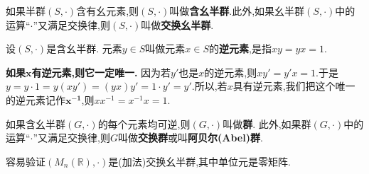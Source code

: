 \documentclass[lang=cn,newtx,10pt,scheme=chinese]{elegantbook}
\begin{document}
\begin{definition}[(交换)含幺半群定义]\label{definition:(交换)幺半群定义}
如果半群\((S,\cdot)\)含有幺元素,则\((S,\cdot)\)叫做\textbf{含幺半群}.此外,如果幺半群\((S,\cdot)\)中的运算“$\cdot$”又满足交换律,则\((S,\cdot)\)叫做\textbf{交换幺半群}.
\end{definition}

\begin{definition}
设\((S,\cdot)\)是含幺半群. 元素\(y\in S\)叫做元素\(x\in S\)的\textbf{逆元素},是指\(xy = yx = 1\).
\end{definition}
\begin{note}
\textbf{如果\(\boldsymbol{x}\)有逆元素,则它一定唯一.} 因为若\(y'\)也是\(x\)的逆元素,则\(xy' = y'x = 1\).于是$y = y\cdot 1 = y(xy') = (yx)y' = 1\cdot y' = y'.$所以,若\(x\)具有逆元素,我们把这个唯一的逆元素记作\(\boldsymbol{x^{-1}}\),则\(xx^{-1} = x^{-1}x = 1\).
\end{note}

\begin{definition}
如果含幺半群\((G,\cdot)\)的每个元素均可逆,则\((G,\cdot)\)叫做\textbf{群}. 此外,如果群\((G,\cdot)\)中的运算“$\cdot$”又满足交换律,则\(G\)叫做\textbf{交换群}或叫\textbf{阿贝尔(Abel)群}.
\end{definition}




\begin{note}
    容易验证$\left( M_n\left( \mathbb{R} \right) ,\cdot \right)$是(加法)交换幺半群,其中单位元是零矩阵.
\end{note}
\end{document}
